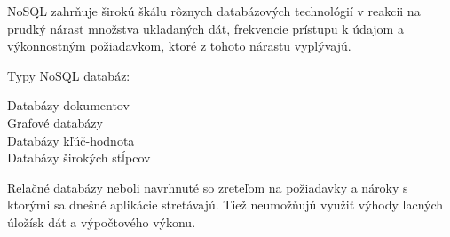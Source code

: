 	
	\ac{NoSQL} zahrňuje širokú škálu rôznych databázových technológií v reakcii na prudký nárast množstva ukladaných dát, frekvencie prístupu k údajom a výkonnostným požiadavkom, ktoré z tohoto nárastu  vyplývajú.
	
	Typy NoSQL databáz:
	\begin{description}
		\item[Databázy dokumentov]
		\item[Grafové databázy]
		\item[Databázy kľúč-hodnota]
		\item[Databázy širokých stĺpcov]
	\end{description}
	
	Relačné databázy neboli navrhnuté so zreteľom na požiadavky a nároky s ktorými sa dnešné aplikácie stretávajú. Tiež neumožňujú využiť výhody lacných úložísk dát a výpočtového výkonu.
	
	
	
